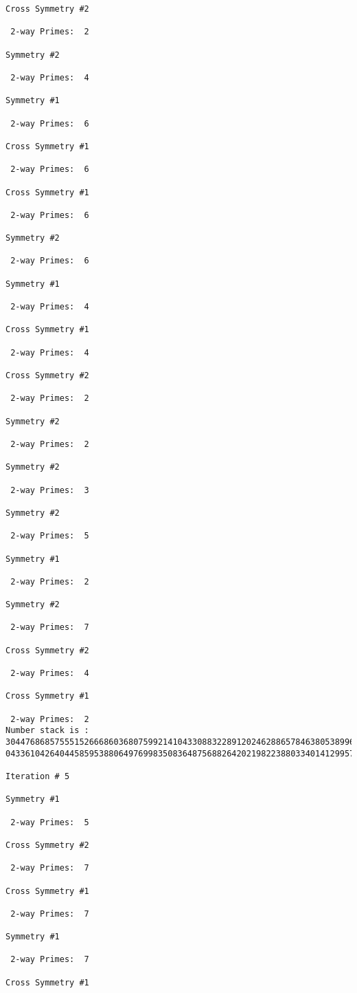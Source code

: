 {{{{\begin{verbatim}
Cross Symmetry #2

 2-way Primes: 	2

Symmetry #2

 2-way Primes: 	4

Symmetry #1

 2-way Primes: 	6

Cross Symmetry #1

 2-way Primes: 	6

Cross Symmetry #1

 2-way Primes: 	6

Symmetry #2

 2-way Primes: 	6

Symmetry #1

 2-way Primes: 	4

Cross Symmetry #1

 2-way Primes: 	4

Cross Symmetry #2

 2-way Primes: 	2

Symmetry #2

 2-way Primes: 	2

Symmetry #2

 2-way Primes: 	3

Symmetry #2

 2-way Primes: 	5

Symmetry #1

 2-way Primes: 	2

Symmetry #2

 2-way Primes: 	7

Cross Symmetry #2

 2-way Primes: 	4

Cross Symmetry #1

 2-way Primes: 	2
Number stack is :
30447686857555152666860368075992141043308832289120246288657846380538996794608835958544046240163340857
04336104264044585953880649769983508364875688264202198223880334014129957086306866625155575868674403758

Iteration #	5

Symmetry #1

 2-way Primes: 	5

Cross Symmetry #2

 2-way Primes: 	7

Cross Symmetry #1

 2-way Primes: 	7

Symmetry #1

 2-way Primes: 	7

Cross Symmetry #1


\end{verbatim}}}}}
